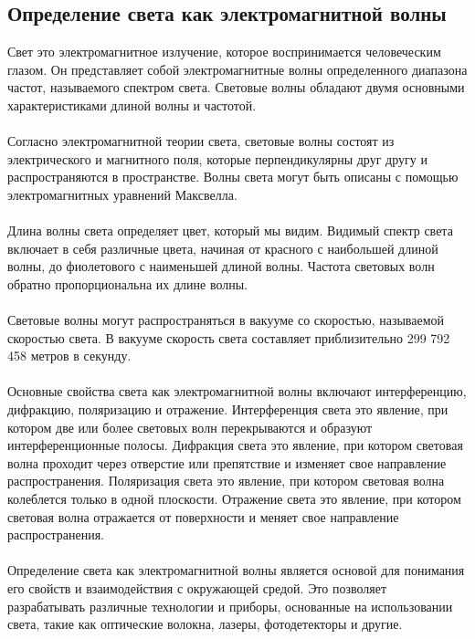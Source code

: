 \documentclass{article}
\begin{document}
\subsection{Определение света как электромагнитной волны}
Свет  это электромагнитное излучение, которое воспринимается человеческим глазом. Он представляет собой электромагнитные волны определенного диапазона частот, называемого спектром света. Световые волны обладают двумя основными характеристиками  длиной волны и частотой.\\
~\\
Согласно электромагнитной теории света, световые волны состоят из электрического и магнитного поля, которые перпендикулярны друг другу и распространяются в пространстве. Волны света могут быть описаны с помощью электромагнитных уравнений Максвелла.\\
~\\
Длина волны света определяет цвет, который мы видим. Видимый спектр света включает в себя различные цвета, начиная от красного с наибольшей длиной волны, до фиолетового с наименьшей длиной волны. Частота световых волн обратно пропорциональна их длине волны.\\
~\\
Световые волны могут распространяться в вакууме со скоростью, называемой скоростью света. В вакууме скорость света составляет приблизительно 299 792 458 метров в секунду.\\
~\\
Основные свойства света как электромагнитной волны включают интерференцию, дифракцию, поляризацию и отражение. Интерференция света  это явление, при котором две или более световых волн перекрываются и образуют интерференционные полосы. Дифракция света  это явление, при котором световая волна проходит через отверстие или препятствие и изменяет свое направление распространения. Поляризация света  это явление, при котором световая волна колеблется только в одной плоскости. Отражение света  это явление, при котором световая волна отражается от поверхности и меняет свое направление распространения.\\
~\\
Определение света как электромагнитной волны является основой для понимания его свойств и взаимодействия с окружающей средой. Это позволяет разрабатывать различные технологии и приборы, основанные на использовании света, такие как оптические волокна, лазеры, фотодетекторы и другие.
\end{document}
